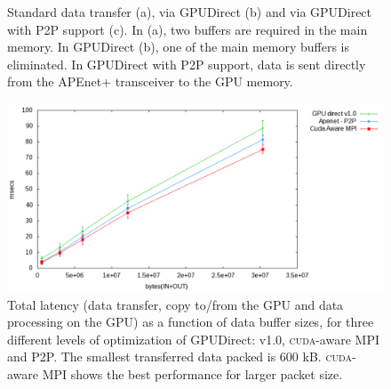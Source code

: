 \documentclass[journal]{IEEEtran}
\begin{document}
\begin{figure}[!t]
\centering
{}
\hspace{1mm}
\caption{Standard data transfer (a), via GPUDirect (b) and via
  GPUDirect with P2P support (c). In (a), two buffers are required in
  the main memory. In GPUDirect (b), one of the main memory buffers is
  eliminated. In GPUDirect with P2P support, data is sent directly
  from the APEnet+ transceiver to the GPU memory.}
\end{figure}

\begin{figure}[!t]
  \centering
  \includegraphics[width=0.85\linewidth]{figures/datatransfer}
  \caption{Total latency (data transfer, copy to/from the GPU and data
    processing on the GPU) as a function of data buffer sizes, for
    three different levels of optimization of GPUDirect: v1.0,
    \textsc{cuda}-aware MPI and P2P. The smallest transferred data
    packed is 600 kB.  \textsc{cuda}-aware MPI shows the best
    performance for larger packet size.}
  \label{fig:xferlatency}
\end{figure}
\end{document}
